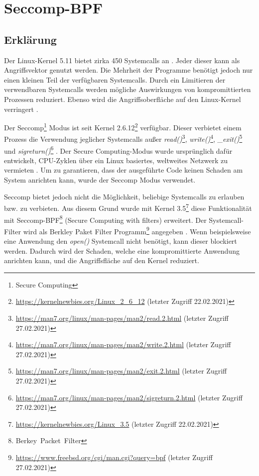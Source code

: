 \section{Seccomp-BPF}
\label{lab:seccompbpf}

\subsection{Erklärung}
\label{lab:seccomp_explained}
Der Linux-Kernel 5.11 bietet zirka 450 Systemcalls an \cite{kernelsystemcalls}.
Jeder dieser kann als Angriffsvektor genutzt werden. Die Mehrheit der Programme
benötigt jedoch nur einen kleinen Teil der verfügbaren Systemcalls. Durch ein
Limitieren der verwendbaren Systemcalls werden mögliche Auswirkungen von
kompromittierten Prozessen
reduziert. Ebenso wird die Angriffsoberfläche auf den Linux-Kernel verringert
\cite{kernel_seccomp}. 

Der Seccomp\footnote{Secure Computing} Modus ist seit Kernel
2.6.12\footnote{\url{https://kernelnewbies.org/Linux_2_6_12} (letzter Zugriff
22.02.2021)} verfügbar. Dieser verbietet einem Prozess die Verwendung jeglicher
Systemcalls au{\ss}er
\emph{read()}\footnote{\url{https://man7.org/linux/man-pages/man2/read.2.html}
(letzter Zugriff 27.02.2021)},
\emph{write()}\footnote{\url{https://man7.org/linux/man-pages/man2/write.2.html}
(letzter Zugriff 27.02.2021)},
\emph{\_exit()}\footnote{\url{https://man7.org/linux/man-pages/man2/exit.2.html}
(letzter Zugriff 27.02.2021)} und
\emph{sigreturn()}\footnote{\url{https://man7.org/linux/man-pages/man2/sigreturn.2.html}
(letzter Zugriff 27.02.2021)} \cite{man_seccomp}. Der Secure Computing-Modus
wurde ursprünglich dafür entwickelt, CPU-Zyklen über ein Linux basiertes,
weltweites Netzwerk zu vermieten \cite{lwn_cpushare}. Um zu garantieren, dass
der ausgeführte Code keinen Schaden am System anrichten kann, wurde der Seccomp
Modus verwendet. 

Seccomp bietet jedoch nicht die Möglichkeit, beliebige Systemcalls zu erlauben
bzw. zu verbieten. Aus diesem Grund wurde mit Kernel
3.5\footnote{\url{https://kernelnewbies.org/Linux\_3.5} (letzter Zugriff
22.02.2021)} diese Funktionalität mit
\linebreak\mbox{Seccomp-BPF\footnote{Berkey Packet Filter}} (Secure Computing with filters) erweitert.
Der Systemcall-Filter wird als Berkley Paket Filter
Programm\footnote{\url{https://www.freebsd.org/cgi/man.cgi?query=bpf} (letzter
Zugriff 27.02.2021)} angegeben \cite{kernel_seccomp}. Wenn beispielsweise eine
Anwendung den \emph{open()} Systemcall nicht benötigt, kann dieser blockiert
werden. Dadurch wird der Schaden, welche eine kompromittierte Anwendung
anrichten kann, und die Angriffsfläche auf den Kernel reduziert.


